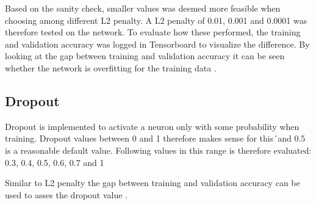 Based on the sanity check, smaller values was deemed more feasible when choosing among different L2 penalty. A L2 penalty of 0.01, 0.001 and 0.0001 was therefore tested on the network. To evaluate how these performed, the training and validation accuracy was logged in Tensorboard to visualize the difference. By looking at the gap between training and validation accuracy it can be seen whether the network is overfitting for the training data \citep{NN3}.

\subsection{Dropout}
Dropout is implemented to activate a neuron only with some probability when training. Dropout values between 0 and 1 therefore makes sense for this´and 0.5 is a reasonable default value\citep{NN3}. Following values in this range is therefore evaluated: 0.3, 0.4, 0.5, 0.6, 0.7 and 1

Similar to L2 penalty the gap between training and validation accuracy can be used to asses the dropout value \citep{NN3}. 





